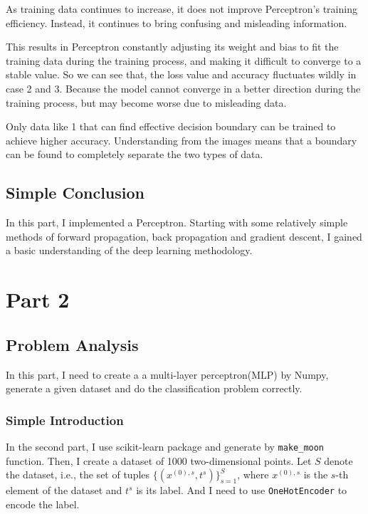 \documentclass{article}
\begin{document}
As training data continues to increase, it does not improve Perceptron's training efficiency. Instead, it continues to bring confusing and misleading information.

This results in Perceptron constantly adjusting its weight and bias to fit the training data during the training process, and making it difficult to converge to a stable value. So we can see that, the loss value and accuracy fluctuates wildly in case 2 and 3. Because the model cannot converge in a better direction during the training process, but may become worse due to misleading data.

Only data like 1 that can find effective decision boundary can be trained to achieve higher accuracy. Understanding from the images means that a boundary can be found to completely separate the two types of data.

\subsection{Simple Conclusion}

In this part, I implemented a Perceptron. Starting with some relatively simple methods of forward propagation, back propagation and gradient descent, I gained a basic understanding of the deep learning methodology.

\section{Part 2}


\subsection{Problem Analysis}

In this part, I need to create a a multi-layer perceptron(MLP) by Numpy, generate a given dataset and do the classification problem correctly.

\subsubsection{Simple Introduction}

In the second part, I use scikit-learn package and generate by \texttt{make\_moon} function. Then, I create a dataset of 1000 two-dimensional points. Let $S$ denote the dataset, i.e., the set of tuples $\{(x^{(0),s}, t^{s})\}_{s=1}^{S}$, where $x^{(0),s}$ is the $s$-th element of the dataset and $t^{s}$ is its label. And I need to use \texttt{OneHotEncoder} to encode the label.
\end{document}
